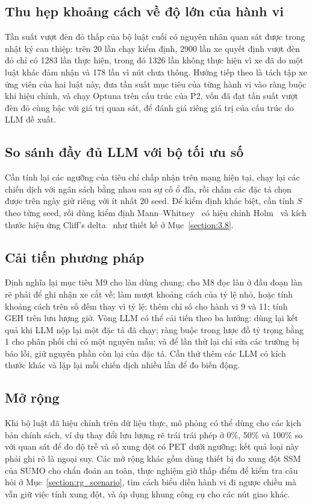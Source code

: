 \documentclass[../main.tex]{subfiles}
\begin{document}
\subsection{Thu hẹp khoảng cách về độ lớn của hành vi}

Tần suất vượt đèn đỏ thấp của bộ luật cuối có nguyên nhân quan sát được trong nhật ký can thiệp: trên 20 lần chạy kiểm định, 2900 lần xe quyết định vượt đèn đỏ chỉ có 1283 lần thực hiện, trong đó 1326 lần không thực hiện vì xe đã do một luật khác đảm nhận và 178 lần vì nút chưa thông. Hướng tiếp theo là tách tập xe ứng viên của hai luật này, đưa tần suất mục tiêu của từng hành vi vào ràng buộc khi hiệu chỉnh, và chạy Optuna trên cấu trúc của P2, vốn đã đạt tần suất vượt đèn đỏ cùng bậc với giá trị quan sát, để đánh giá riêng giá trị của cấu trúc do LLM đề xuất.

\subsection{So sánh đầy đủ LLM với bộ tối ưu số}

Cần tính lại các ngưỡng của tiêu chí chấp nhận trên mạng hiện tại, chạy lại các chiến dịch với ngân sách bằng nhau sau sự cố ổ đĩa, rồi chấm các đặc tả chọn được trên ngày giữ riêng với ít nhất 20 seed. Để kiểm định khác biệt, cần tính $S$ theo từng seed, rồi dùng kiểm định Mann--Whitney~\cite{mann1947test} có hiệu chỉnh Holm~\cite{holm1979simple} và kích thước hiệu ứng Cliff's delta~\cite{cliff1993dominance} như thiết kế ở Mục~\ref{section:3.8}.

\subsection{Cải tiến phương pháp}

Định nghĩa lại mục tiêu M9 cho làn dùng chung; cho M8 đọc làn ở đầu đoạn làn rẽ phải để ghi nhận xe cắt về; làm mượt khoảng cách của tỷ lệ nhỏ, hoặc tính khoảng cách trên số đếm thay vì tỷ lệ; thêm chỉ số cho hành vi 9 và 11; tính GEH trên lưu lượng giờ. Vòng LLM có thể cải tiến theo ba hướng: dùng lại kết quả khi LLM nộp lại một đặc tả đã chạy; ràng buộc trong lược đồ tỷ trọng bằng 1 cho phân phối chỉ có một nguyên mẫu; và để lần thử lại chỉ sửa các trường bị báo lỗi, giữ nguyên phần còn lại của đặc tả. Cần thử thêm các LLM có kích thước khác và lặp lại mỗi chiến dịch nhiều lần để đo biến động.

\subsection{Mở rộng}

Khi bộ luật đã hiệu chỉnh trên dữ liệu thực, mô phỏng có thể dùng cho các kịch bản chính sách, ví dụ thay đổi lưu lượng rẽ trái trái phép ở 0\%, 50\% và 100\% so với quan sát để đo độ trễ và số xung đột có PET dưới ngưỡng; kết quả loại này phải ghi rõ là ngoại suy. Các mở rộng khác gồm dùng thiết bị đo xung đột SSM của SUMO cho chẩn đoán an toàn, thực nghiệm giờ thấp điểm để kiểm tra câu hỏi ở Mục~\ref{section:rg_scenario}, tìm cách biểu diễn hành vi đi ngược chiều mà vẫn giữ việc tính xung đột, và áp dụng khung công cụ cho các nút giao khác.
\end{document}
